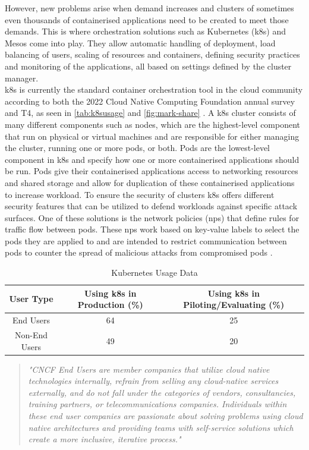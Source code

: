  However, new problems arise when demand increases and clusters of sometimes even thousands of containerised applications need to be created to meet those demands. This is where orchestration solutions such as Kubernetes (\acrshort{k8s}) \cite{Bernstein2014} and Mesos \cite{Mesos} come into play. They allow automatic handling of deployment, load balancing of users, scaling of resources and containers, defining security practices and monitoring of the applications, all based on settings defined by the cluster manager.
\\[10pt]

\acrshort{k8s} is currently the standard container orchestration tool in the cloud community according to both the 2022 Cloud Native Computing Foundation annual survey and T4, as seen in \autoref{tab:k8susage} \cite{CNCFSurvey} and \autoref{fig:mark-share} \cite{t4}. A \acrshort{k8s} cluster consists of many different components such as nodes, which are the highest-level component that run on physical or virtual machines and are responsible for either managing the cluster, running one or more pods, or both. Pods are the lowest-level component in \acrshort{k8s} and specify how one or more containerised applications should be run. Pods give their containerised applications access to networking resources and shared storage and allow for duplication of these containerised applications to increase workload. To ensure the security of clusters \acrshort{k8s} offers different security features that can be utilized to defend workloads against specific attack surfaces. One of these solutions is the network policies (\acrshort{np}s) that define rules for traffic flow between pods. These \acrshort{np}s work based on key-value labels to select the pods they are applied to and are intended to restrict communication between pods to counter the spread of malicious attacks from compromised pods \cite{nps}.
\\[10pt]
\begin{table}[h]
    \centering
    \begin{tabular}{|c|c|c|}
        \hline
        \textbf{User Type} & \textbf{Using \acrshort{k8s} in Production (\%)} & \textbf{Using \acrshort{k8s} in Piloting/Evaluating (\%)} \\
        \hline
        End Users & 64 & 25 \\ 
        Non-End Users & 49 & 20 \\
        \hline
    \end{tabular}
    \caption{Kubernetes Usage Data \cite{CNCFSurvey}}
    \label{tab:k8susage}
\end{table}
\begin{quote}
\textit{"CNCF End Users are member companies that utilize cloud native technologies internally, refrain from selling any cloud-native services externally, and do not fall under the categories of vendors, consultancies, training partners, or telecommunications companies. Individuals within these end user companies are passionate about solving problems using cloud native architectures and providing teams with self-service solutions which create a more inclusive, iterative process." \cite{CNCFSurvey}}
\end{quote}

